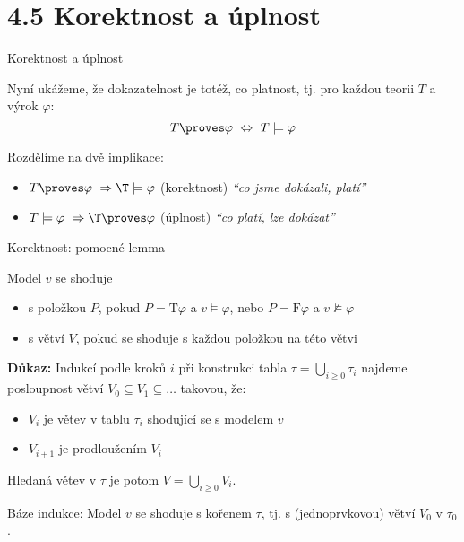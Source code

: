 \documentclass{beamer}
\begin{document}
\section{4.5 Korektnost a úplnost}


\begin{frame}{Korektnost a úplnost}
    
    Nyní ukážeme, že \alert{dokazatelnost} je totéž, co \alert{platnost}, tj. pro každou teorii $T$ a výrok $\varphi$:
    \alert{
    $$
    T\proves\varphi\ \Leftrightarrow\ T\models\varphi
    $$
    }

    \pause
    Rozdělíme na dvě implikace:\pause
    
    \begin{itemize}
        \item \alert{$T\proves\varphi\ \Rightarrow\T\models\varphi$} \hspace{0.5cm} (korektnost) \hfill {\it``co jsme dokázali, platí''}\pause
        \item\alert{$T\models\varphi\ \Rightarrow\T\proves\varphi$}  \hspace{0.5cm} (úplnost) \hfill {\it ``co platí, lze dokázat''}
    \end{itemize} 
 
\end{frame}


\begin{frame}{Korektnost: pomocné lemma}


    Model $v$ se \alert{shoduje}\pause
    \begin{itemize}
        \item \alert{s položkou $P$}, pokud
        $P=\mathrm{T}\varphi$ a $v\models\varphi$, nebo $P=\mathrm{F}\varphi$ a $v\not\models\varphi$\pause
        \item \alert{s větví $V$}, pokud se shoduje s každou položkou na této větvi
    \end{itemize}
    
    \medskip

    \pause

    \smallskip
    
    \pause
    \textbf{Důkaz:}
    Indukcí podle kroků $i$ při konstrukci tabla $\tau=\bigcup_{i\geq 0}\tau_i$ najdeme posloupnost větví $V_0\subseteq V_1\subseteq\dots$ takovou, že:\pause
     \begin{itemize}
        \item $V_i$ je větev v tablu $\tau_i$ shodující se s modelem $v$\pause
        \item $V_{i+1}$ je prodloužením $V_i$\pause
     \end{itemize}

    Hledaná větev v $\tau$ je potom $V=\bigcup_{i\geq 0}V_i$.\pause
    
    \alert{Báze indukce:} Model $v$ se shoduje s kořenem $\tau$, tj. s (jednoprvkovou) větví $V_0$ v $\tau_0$.

\end{frame}
\end{document}
